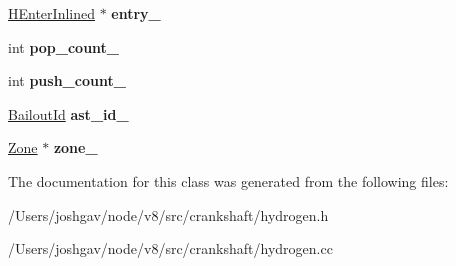 \begin{DoxyCompactItemize}
\item 
\hyperlink{classv8_1_1internal_1_1_h_enter_inlined}{H\+Enter\+Inlined} $\ast$ {\bfseries entry\+\_\+}\hypertarget{classv8_1_1internal_1_1_h_environment_ac26792fded6487b4a06157a936f4bba1}{}\label{classv8_1_1internal_1_1_h_environment_ac26792fded6487b4a06157a936f4bba1}

\item 
int {\bfseries pop\+\_\+count\+\_\+}\hypertarget{classv8_1_1internal_1_1_h_environment_a625cb3175e010edc8e96abaa89b680f3}{}\label{classv8_1_1internal_1_1_h_environment_a625cb3175e010edc8e96abaa89b680f3}

\item 
int {\bfseries push\+\_\+count\+\_\+}\hypertarget{classv8_1_1internal_1_1_h_environment_ac84590c2679fbac173813be878eb69f9}{}\label{classv8_1_1internal_1_1_h_environment_ac84590c2679fbac173813be878eb69f9}

\item 
\hyperlink{classv8_1_1internal_1_1_bailout_id}{Bailout\+Id} {\bfseries ast\+\_\+id\+\_\+}\hypertarget{classv8_1_1internal_1_1_h_environment_a14d4e480934ab42833ff1d69f15e0e45}{}\label{classv8_1_1internal_1_1_h_environment_a14d4e480934ab42833ff1d69f15e0e45}

\item 
\hyperlink{classv8_1_1internal_1_1_zone}{Zone} $\ast$ {\bfseries zone\+\_\+}\hypertarget{classv8_1_1internal_1_1_h_environment_a77470b184050161dbb6db6285b0389f8}{}\label{classv8_1_1internal_1_1_h_environment_a77470b184050161dbb6db6285b0389f8}

\end{DoxyCompactItemize}


The documentation for this class was generated from the following files\+:\begin{DoxyCompactItemize}
\item 
/\+Users/joshgav/node/v8/src/crankshaft/hydrogen.\+h\item 
/\+Users/joshgav/node/v8/src/crankshaft/hydrogen.\+cc\end{DoxyCompactItemize}

